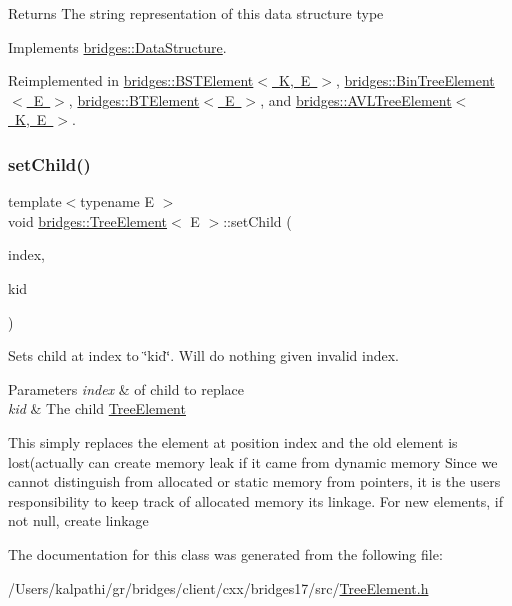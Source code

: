 \begin{DoxyReturn}{Returns}
The string representation of this data structure type 
\end{DoxyReturn}


Implements \mbox{\hyperlink{classbridges_1_1_data_structure_a957a63b106e340bc753620c650632bdc}{bridges\+::\+Data\+Structure}}.



Reimplemented in \mbox{\hyperlink{classbridges_1_1_b_s_t_element_af3843873c508c24f90b6e73a6f490bf8}{bridges\+::\+B\+S\+T\+Element$<$ K, E $>$}}, \mbox{\hyperlink{classbridges_1_1_bin_tree_element_a0a154f68ef0a58715e598a6ef92b9e59}{bridges\+::\+Bin\+Tree\+Element$<$ E $>$}}, \mbox{\hyperlink{classbridges_1_1_b_t_element_a43cc18d2c1e71c399782a306b60e4260}{bridges\+::\+B\+T\+Element$<$ E $>$}}, and \mbox{\hyperlink{classbridges_1_1_a_v_l_tree_element_a24c005f8e07a7a2682225cead3b7e364}{bridges\+::\+A\+V\+L\+Tree\+Element$<$ K, E $>$}}.

\mbox{\label{classbridges_1_1_tree_element_aa12cb7cb4b4f559bdf0967872b0a6e7d}} 
\subsubsection{\texorpdfstring{set\+Child()}{setChild()}}
{\footnotesize\ttfamily template$<$typename E $>$ \\
void \mbox{\hyperlink{classbridges_1_1_tree_element}{bridges\+::\+Tree\+Element}}$<$ E $>$\+::set\+Child (\begin{DoxyParamCaption}\item[{const size\+\_\+t \&}]{index,  }\item[{\mbox{\hyperlink{classbridges_1_1_tree_element}{Tree\+Element}}$<$ E $>$ $\ast$}]{kid }\end{DoxyParamCaption})\hspace{0.3cm}{\ttfamily [inline]}}

Sets child at index to \char`\"{}kid\char`\"{}. Will do nothing given invalid index.


\begin{DoxyParams}{Parameters}
{\em index} & of child to replace \\
\hline
{\em kid} & The child \mbox{\hyperlink{classbridges_1_1_tree_element}{Tree\+Element}} \\
\hline
\end{DoxyParams}
This simply replaces the element at position index and the old element is lost(actually can create memory leak if it came from dynamic memory Since we cannot distinguish from allocated or static memory from pointers, it is the user\textquotesingle{}s responsibility to keep track of allocated memory its linkage. For new elements, if not null, create linkage

The documentation for this class was generated from the following file\+:\begin{DoxyCompactItemize}
\item 
/\+Users/kalpathi/gr/bridges/client/cxx/bridges17/src/\mbox{\hyperlink{_tree_element_8h}{Tree\+Element.\+h}}\end{DoxyCompactItemize}
